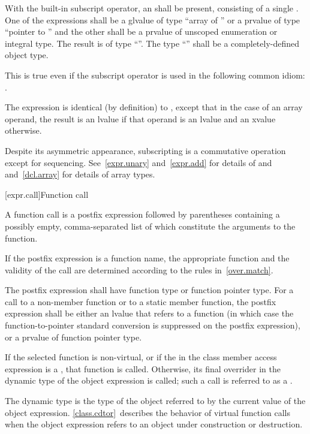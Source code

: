 \pnum
With the built-in subscript operator,
an  shall be present,
consisting of a single .
One of the expressions shall be a glvalue of type ``array of
'' or a prvalue of type ``pointer
to '' and the other shall be a prvalue of unscoped enumeration or integral type.
The result is of type ``''.
%
The type ``'' shall be a completely-defined object type.%
\begin{footnote}
This
is true even if the subscript operator is used in the following common idiom:
.
\end{footnote}
The expression  is identical (by definition) to
,
except that in the case of an array operand, the result is an lvalue
if that operand is an lvalue and an xvalue otherwise.

\pnum
\begin{note}
Despite its asymmetric appearance, subscripting is a commutative
operation except for sequencing.
See~\ref{expr.unary} and~\ref{expr.add} for details of \tcode{*} and
\tcode{+} and~\ref{dcl.array} for details of array types.
\end{note}

[expr.call]{Function call}

\pnum
{}%
%
%
A function call is a postfix expression followed by parentheses
containing a possibly empty, comma-separated list of
 which
constitute the arguments to the function.
\begin{note}
If the postfix expression is a function name,
the appropriate function and the validity of the call
are determined according to the rules in~\ref{over.match}.
\end{note}
The postfix expression shall
have function type or function pointer type.
For a call to a non-member function or to a static member function,
the postfix expression shall be either an lvalue that refers to a
function (in which case the function-to-pointer standard
conversion is suppressed on the postfix expression),
or a prvalue of function pointer type.

\pnum
If the selected
function is non-virtual, or if the  in the class
member access expression is a , that function is
called. Otherwise, its final overrider in the dynamic type
of the object expression is called; such a call is referred to as a
.
\begin{note}
The dynamic type is the type of the object referred to by the
current value of the object expression. \ref{class.cdtor}~describes the
behavior of virtual function calls when the object expression
refers to
an object under construction or destruction.
\end{note}

